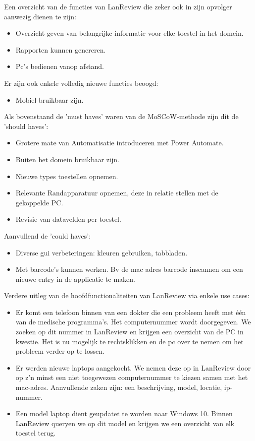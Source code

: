 Een overzicht van de functies van LanReview die zeker ook in zijn opvolger aanwezig dienen te zijn:
\begin{itemize}
    \item  Overzicht geven van belangrijke informatie voor elke toestel in het domein.
    \item Rapporten kunnen genereren.
\item Pc’s bedienen vanop afstand.
\end{itemize}
Er zijn ook enkele volledig nieuwe functies beoogd:
\begin{itemize}
\item Mobiel bruikbaar zijn.
\end{itemize}
Als bovenstaand de 'must haves' waren van de MoSCoW-methode zijn dit de 'should haves':
\begin{itemize}
    \item Grotere mate van Automatisatie introduceren met Power Automate.
    \item Buiten het domein bruikbaar zijn.
    \item Nieuwe types toestellen opnemen.
    \item Relevante Randapparatuur opnemen, deze in relatie stellen met de gekoppelde PC.
    \item Revisie van datavelden per toestel.
\end{itemize}
Aanvullend de 'could haves':
\begin{itemize}
    \item Diverse gui verbeteringen: kleuren gebruiken, tabbladen.
    \item Met barcode's kunnen werken. Bv de mac adres barcode inscannen om een nieuwe entry in de applicatie te maken.
\end{itemize}

\vspace{5mm}

Verdere uitleg van de hoofdfunctionaliteiten van LanReview via enkele use cases:
\begin{itemize}
    \item Er komt een telefoon binnen van een dokter die een probleem heeft met één van de medische programma's. Het computernummer wordt doorgegeven. We zoeken op dit nummer in LanReview en krijgen een overzicht van de PC in kwestie. Het is nu mogelijk te rechtsklikken en de pc over te nemen om het probleem verder op te lossen.
    \item Er werden nieuwe laptops aangekocht. We nemen deze op in LanReview door op z'n minst een niet toegewezen computernummer te kiezen samen met het mac-adres. Aanvullende zaken zijn: een beschrijving, model, locatie, ip-nummer.
    \item Een model laptop dient geupdatet te worden naar Windows 10. Binnen LanReview queryen we op dit model en krijgen we een overzicht van elk toestel terug.
\end{itemize}

